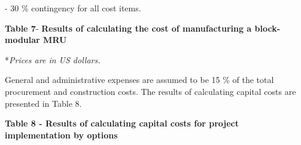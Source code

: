 - 30 \% contingency for all cost items.

{\bfseries Table 7}- {\bfseries Results of calculating the cost of
manufacturing a block-modular MRU}


*\emph{Prices are in US dollars.}

General and administrative expenses are assumed to be 15 \% of the total
procurement and construction costs. The results of calculating capital
costs are presented in Table 8.

{\bfseries Table 8 - Results of calculating capital costs for project
implementation by options}

